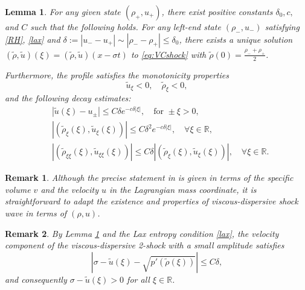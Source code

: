 \documentclass[11pt,reqno]{amsart}
\newtheorem{lemma}{Lemma}[section]
\newtheorem{remark}{Remark}[section]
\numberwithin{equation}{section} %
\newcommand{\R}{\mathbb{R}}
\begin{document}
\begin{lemma}\label{lem:shock-profile}\cite{HKKL25-JDE}
For any given state $(\rho_+, u_+)$, there exist positive constants $\delta_0, c,$ and $C$ such that the following holds. For any left-end state $(\rho_-, u_-)$ satisfying \eqref{RH}, \eqref{lax} and $\delta := |u_- - u_+|\sim |\rho_- - \rho_+| \leq \delta_0$, there exists a unique solution $(\tilde{\rho}, \tilde{u})(\xi) = (\tilde{\rho}, \tilde{u})(x-\sigma t)$ to \eqref{eq:VCshock} with $\tilde{\rho}(0)=\frac{\rho_- + \rho_+}{2}$.

Furthermore, the profile satisfies the monotonicity properties
\[
    \tilde{u}_\xi < 0, \quad \tilde{\rho}_\xi < 0,
\]
and the following decay estimates:
\begin{align*}
    &|\tilde{u}(\xi) - u_\pm| \leq C\delta e^{-c\delta |\xi|}, \quad \text{for } \pm \xi > 0, \\
    &|(\tilde{\rho}_\xi(\xi), \tilde{u}_\xi(\xi))| \leq C\delta^2 e^{-c\delta |\xi|}, \quad \forall \xi \in \mathbb{R}, \\
    &|(\tilde{\rho}_{\xi \xi}(\xi), \tilde{u}_{\xi \xi}(\xi))| \leq C\delta |(\tilde{\rho}_\xi(\xi), \tilde{u}_\xi(\xi))|, \quad \forall \xi \in \mathbb{R}.
\end{align*}
\end{lemma}

\begin{remark}
	Although the precise statement in \cite{HKKL25-JDE} is given in terms of the specific volume $v$ and the velocity $u$ in the Lagrangian mass coordinate, it is straightforward to adapt the existence and properties of viscous-dispersive shock wave in terms of $(\rho,u)$.
\end{remark}

\begin{remark}%
    By Lemma \ref{lem:shock-profile} and the Lax entropy condition \eqref{lax}, the velocity component of the viscous-dispersive 2-shock with a small amplitude satisfies
    \begin{equation*}%
    |\sigma -\tilde{u}(\xi) - \sqrt{p'(\tilde{\rho}(\xi))} | \le C \delta,
    \end{equation*} 
    and consequently $\sigma-\tilde{u}(\xi)>0$ for all $\xi\in \R$.
\end{remark}
\end{document}
